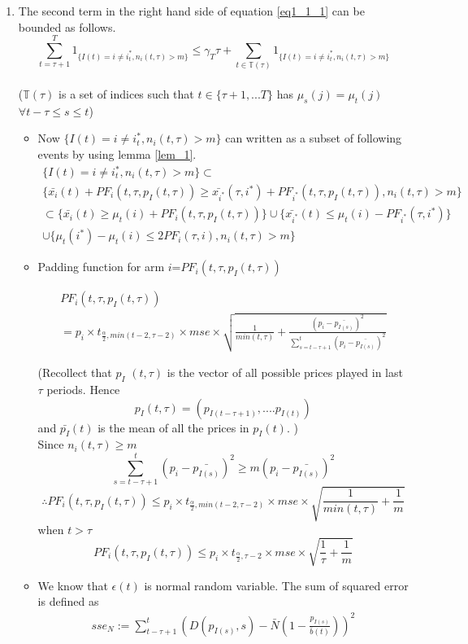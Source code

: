 \documentclass[compress, serif, onlymath, professionalfonts]{beamer}
\begin{document}
\begin{frame}[t,allowframebreaks]
\begin{enumerate}
\item The second term in the right hand side of equation \ref{eq1_1_1} can be bounded as follows.
\begin{equation}
\label{eq4_1}
\sum_{t=\tau+1}^{T}1_{\{I(t)=i\neq i^*_t,n_i(t,\tau)> m\}} \leq \gamma_T\tau + \sum_{t\in \mathbb{T}(\tau)}1_{\{I(t)=i\neq i^*_t,n_i(t,\tau)> m\}}
\end{equation}
\\($\mathbb{T}(\tau)$ is a set of indices such that $t \in \{\tau+1,...T\}$ has $\mu_s(j)=\mu_t(j)$ \\  $\forall t-\tau \leq s \leq t$)
\begin{itemize}
\item Now $\{I(t)=i\neq i^*_t,n_i(t,\tau)> m \}$ can written as a subset of following events by using lemma \ref{lem_1}.
\begin{multline}
\label{eq5}
\{I(t)=i\neq i^*_t,n_i(t,\tau)> m\}\subset \\
\{\bar{x_i}(t)+ PF_i(t,\tau,p_I(t,\tau)) \geq \bar{x_{i^*}}(\tau,i^*)+ PF_{i^*}(t,\tau,p_I(t,\tau)),n_i(t,\tau)> m \}\\
\subset \{ \bar{x_i}(t) \geq \mu_t(i) + PF_{i}(t,\tau,p_I(t,\tau))\}  \cup \{\bar{x_{i^*}}(t) \leq \mu_t(i) - PF_{i^*}(\tau,i^*)\}\\
\cup \{\mu_t(i^*)-\mu_t(i) \leq 2PF_{i}(\tau,i),n_i(t,\tau)> m\}
\end{multline}


\item
Padding function for arm $i$=$PF_{i}(t,\tau,p_I(t,\tau))$

\begin{multline}
PF_{i}(t,\tau,p_I(t,\tau))\\= p_i\times t_{\frac{\alpha}{2},min(t-2,\tau-2)}\times mse \times \sqrt{\frac{1}{min(t,\tau)}+\frac{(p_i-\bar{p_{I(s)}})^2}{\sum_{s=t-\tau+1}^{t}(p_i-\bar{p_{I(s)}})^2}}
\end{multline}

(Recollect that $p_I$ $(t,\tau )$ is the vector of all possible prices played in last $\tau $ periods. Hence
$$p_I(t,\tau) = (p_{I(t-\tau +1)},....p_{I(t)})$$
and $\bar{p_I} (t)$ is the mean of all the prices in $p_I (t)$. )\\
Since $n_i(t,\tau) \geq m$
$$\sum_{s=t-\tau+1}^{t}(p_i-\bar{p_{I(s)}})^2  \geq m(p_i-\bar{p_{I(s)}})^2$$
$$\therefore PF_{i}(t,\tau,p_I(t,\tau)) \leq p_i\times t_{\frac{\alpha}{2},min(t-2,\tau-2)}\times mse \times \sqrt{\frac{1}{min(t,\tau)}+\frac{1}{m}}$$
when $t > \tau$
\begin{equation}
\label{star}
PF_{i}(t,\tau,p_I(t,\tau)) \leq p_i\times t_{\frac{\alpha}{2},\tau-2}\times mse \times \sqrt{\frac{1}{\tau}+\frac{1}{m}}
\end{equation}
\item
We know that $\epsilon(t)$ is normal random variable. The sum of squared error is defined as
\begin{equation}
\begin{split}
sse_N := \sum_{t-\tau+1}^{t}(D(p_{I(s)},s)-\bar{N}(1-\frac{p_{I(s)}}{\bar{b}(t)}))^2 
\end{split}
\end{equation}


\end{itemize}
\end{enumerate}
\end{frame}
\end{document}
